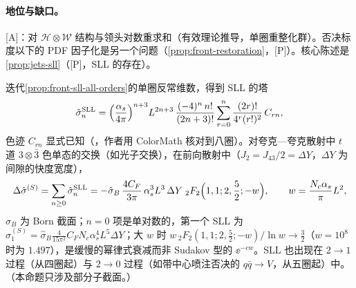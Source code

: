 \paragraph{地位与缺口。}[A]：对 $\mathcal H\otimes\mathcal W$ 结构与领头对数重求和（有效理论推导，单圈重整化群）。否决标度以下的 PDF 因子化是另一个问题（\cref{prop:front-restoration}，[P]）。核心陈述是\cref{prop:jets-sll}（[P]，SLL 的存在）。

\begin{proposition}\label{prop:front-sll-closed-form}
迭代\cref{prop:front-sll-all-orders}的单圈反常维数，得到 SLL 的塔
\begin{equation}\label{eq:front-sll-tower}
\hat\sigma_n^{\rm SLL}=\Bigl(\frac{\alpha_s}{4\pi}\Bigr)^{n+3}L^{2n+3}\,\frac{(-4)^n\,n!}{(2n+3)!}\sum_{r=0}^n\frac{(2r)!}{4^r(r!)^2}\,C_{rn},
\end{equation}
色迹 $C_{rn}$ 显式已知（\cite[式~(14)--(21)]{Becher:2021zkk}，作者用 ColorMath 核对到八圈）。对夸克—夸克散射中 $t$ 道 $3\otimes\bar3$ 色单态的交换（如光子交换），在前向散射中（$J_2=J_{43}/2=\Delta Y$，$\Delta Y$ 为间隙的快度宽度），
\begin{equation}\label{eq:front-sll-closed}
\Delta\hat\sigma^{(S)}=\sum_{n\ge0}\hat\sigma_n^{\rm SLL}=-\hat\sigma_B\,\frac{4C_F}{3\pi}\,\alpha_s^3L^3\,\Delta Y\;{}_2F_2\Bigl(1,1;2,\frac52;-w\Bigr),\qquad w=\frac{N_c\alpha_s}{\pi}L^2 ,
\end{equation}
$\hat\sigma_B$ 为 Born 截面；$n=0$ 项是单对数的，第一个 SLL 为 $\hat\sigma_1^{(S)}=\hat\sigma_B\frac{4}{15\pi^2}C_FN_c\alpha_s^4L^5\Delta Y$；大 $w$ 时 $w\,{}_2F_2(1,1;2,\frac52;-w)/\ln w\to\frac32$（$w=10^8$ 时为 $1.497$），是缓慢的幂律式衰减而非 Sudakov 型的 $\ee^{-cw}$。SLL 也出现在 $2\to1$ 过程（从四圈起）与 $2\to0$ 过程（如带中心喷注否决的 $q\bar q\to V$，从五圈起）中。（本命题只涉及部分子截面。）
\end{proposition}


